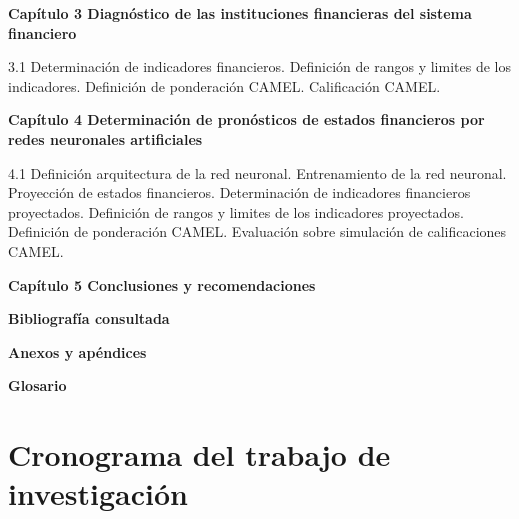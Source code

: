 \documentclass[
  12pt,
]{article}
\begin{document}
\textbf{Capítulo 3 Diagnóstico de las instituciones financieras del
sistema financiero} \vspace{2.5mm}

3.1 Determinación de indicadores financieros.  Definición de
rangos y limites de los indicadores.  Definición de
ponderación CAMEL.  Calificación CAMEL.

\vspace{2.5mm}

\textbf{Capítulo 4 Determinación de pronósticos de estados financieros
por redes neuronales artificiales} \vspace{2.5mm}

4.1 Definición arquitectura de la red neuronal. 
Entrenamiento de la red neuronal.  Proyección de estados
financieros.  Determinación de indicadores financieros
proyectados.  Definición de rangos y limites de los
indicadores proyectados.  Definición de ponderación CAMEL.
 Evaluación sobre simulación de calificaciones CAMEL.

\vspace{2.5mm}

\textbf{Capítulo 5 Conclusiones y recomendaciones} \vspace{2.5mm}

\vspace{2.5mm}

\textbf{Bibliografía consultada} \vspace{2.5mm}

\vspace{2.5mm}

\textbf{Anexos y apéndices} \vspace{2.5mm}

\vspace{2.5mm}

\textbf{Glosario} \vspace{2.5mm}

\newpage

\newpage

\hypertarget{cronograma-del-trabajo-de-investigaciuxf3n}{%
\section{Cronograma del trabajo de
investigación}\label{cronograma-del-trabajo-de-investigaciuxf3n}}
\end{document}
